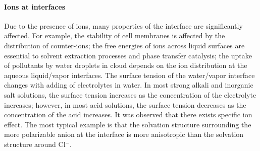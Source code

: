 \paragraph{Ions at interfaces}
Due to the presence of ions, many properties of the interface are significantly affected.
For example, the stability of cell membranes is affected by the distribution of counter-ions\cite{Veziriglu1990}; 
the free energies of ions across liquid surfaces are essential to solvent extraction processes and phase transfer catalysis\cite{Starks1994};
the uptake of pollutants by water droplets in cloud depends on the ion distribution at the aqueous liquid/vapor interfaces.
%
The surface tension of the water/vapor interface changes with adding of electrolytes in water\cite{Pegram2006}.
In most strong alkali and inorganic salt solutions, the surface tension increases as the concentration of the electrolyte increases; 
however, in most acid solutions, the surface tension decreases as the concentration of the acid increases.
%
It was observed that there exists specific ion effect. 
The most typical example is that the solvation structure surrounding the more polarizable \I anion at the interface is more anisotropic than the solvation structure around Cl$^-$.
%

